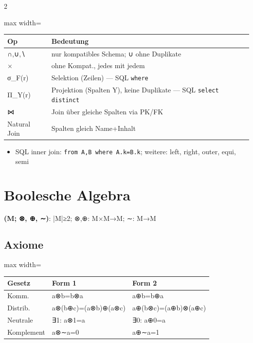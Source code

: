 \documentclass[10pt, a4paper]{article}
\begin{document}
\begin{multicols}{2}
{\small
\begin{adjustbox}{max width=\linewidth}
{\scriptsize
\begin{tabular}{ll}
\toprule
\textbf{Op} & \textbf{Bedeutung} \\
\midrule
∩,∪,∖ & nur kompatibles Schema; ∪ ohne Duplikate \\
× & ohne Kompat., jedes mit jedem \\
σ\_F(r) & Selektion (Zeilen) — SQL \texttt{where} \\
Π\_Y(r) & Projektion (Spalten Y), keine Duplikate — SQL \texttt{select distinct} \\
⋈ & Join über gleiche Spalten via PK/FK \\
Natural Join & Spalten gleich Name+Inhalt \\
\bottomrule
\end{tabular}
}
\end{adjustbox}
}


\begin{itemize}
  \item SQL inner join: \texttt{from A,B where A.k=B.k}; weitere: left, right, outer, equi, semi
\end{itemize}


\section{Boolesche Algebra}

\textbf{(M; ⊗, ⊕, ∼)}: |M|≥2; ⊗,⊕: M×M→M; ∼: M→M



\subsection{Axiome}

{\small
\begin{adjustbox}{max width=\linewidth}
{\scriptsize
\begin{tabular}{lll}
\toprule
\textbf{Gesetz} & \textbf{Form 1} & \textbf{Form 2} \\
\midrule
Komm. & a⊗b=b⊗a & a⊕b=b⊕a \\
Distrib. & a⊗(b⊕c)=(a⊗b)⊕(a⊗c) & a⊕(b⊗c)=(a⊕b)⊗(a⊕c) \\
Neutrale & ∃1: a⊗1=a & ∃0: a⊕0=a \\
Komplement & a⊗∼a=0 & a⊕∼a=1 \\
\bottomrule
\end{tabular}
}
\end{adjustbox}
}



\end{multicols}
\end{document}
